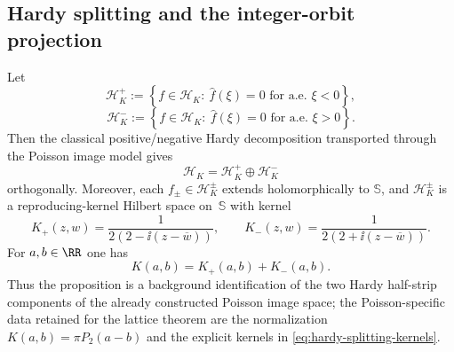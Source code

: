 
\subsection{Hardy splitting and the integer-orbit projection}

\begin{proposition}%
\label{prop:poisson-hardy-splitting}
Let
\[
\mathcal H_K^+
:=
\left\{
f\in\mathcal H_K:\ \widehat f(\xi)=0 \text{ for a.e. }\xi<0
\right\},
\]
\[
\mathcal H_K^-
:=
\left\{
f\in\mathcal H_K:\ \widehat f(\xi)=0 \text{ for a.e. }\xi>0
\right\}.
\]
Then the classical positive/negative Hardy decomposition transported through
the Poisson image model gives
\[
\mathcal H_K=\mathcal H_K^+\oplus \mathcal H_K^-
\]
orthogonally.  Moreover, each $f_\pm\in\mathcal H_K^\pm$ extends
holomorphically to $\mathbb S$, and $\mathcal H_K^\pm$ is a
reproducing-kernel Hilbert space on~$\mathbb S$ with kernel
\begin{equation}\label{eq:hardy-splitting-kernels}
K_+(z,w)=\frac{1}{2(2-\ii(z-\overline w))},
\qquad
K_-(z,w)=\frac{1}{2(2+\ii(z-\overline w))}.
\end{equation}
For $a,b\in\RR$ one has
\begin{equation}\label{eq:hardy-splitting-real-kernel}
K(a,b)=K_+(a,b)+K_-(a,b).
\end{equation}
Thus the proposition is a background identification of the two Hardy
half-strip components of the already constructed Poisson image space; the
Poisson-specific data retained for the lattice theorem are the normalization
$K(a,b)=\pi P_2(a-b)$ and the explicit kernels in
\eqref{eq:hardy-splitting-kernels}.
\end{proposition}


